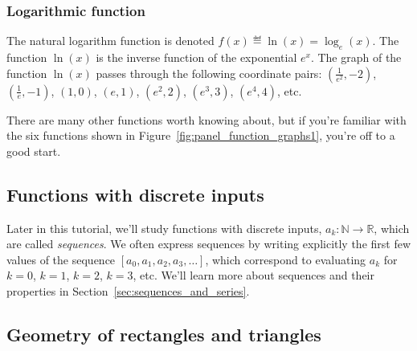 		\subsubsection{Logarithmic function}

			The natural logarithm function is denoted
			$f(x) \eqdef \ln(x) = \log_e(x)$.
			The function $\ln(x)$ is the inverse function of the exponential $e^x$.
			The graph of the function $\ln(x)$
			passes through the following coordinate pairs:
			$(\frac{1}{e^2},-2)$, 
			$(\frac{1}{e},-1)$, 
			$(1,0)$, 
			$(e, 1)$, 
			$(e^2, 2)$, 
			$(e^3, 3)$, 
			$(e^4, 4)$, etc.




		\noindent
		There are many other functions worth knowing about,
		but if you're familiar with the six functions shown in Figure~\ref{fig:panel_function_graphs1},
		you're off to a good start.



	\subsection{Functions with discrete inputs}

		Later in this tutorial,
		we'll study functions with discrete inputs,
		$a_k : \mathbb{N} \to \mathbb{R}$,
		which are called \emph{sequences}.
		We often express sequences by writing explicitly
		the first few values of the sequence $[a_0, a_1, a_2, a_3, \ldots]$,
		which correspond to evaluating $a_k$ for $k=0$, $k=1$, $k=2$, $k=3$, etc.
		We'll learn more about sequences and their properties in Section~\ref{sec:sequences_and_series}.
		




	\subsection{Geometry of rectangles and triangles}


